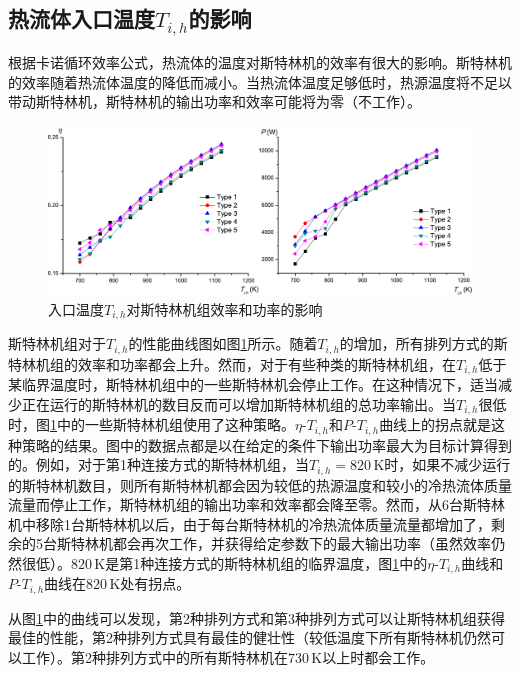 \subsection{热流体入口温度$T_{i,h}$的影响}
\label{sec:T_i_h}
根据卡诺循环效率公式，热流体的温度对斯特林机的效率有很大的影响。斯特林机的效率随着热流体温度的降低而减小。当热流体温度足够低时，热源温度将不足以带动斯特林机，斯特林机的输出功率和效率可能将为零（不工作）。
\begin{figure}[htpb]
\begin{center}
	\includegraphics[width = 0.95\columnwidth]{fig/T_ih}
	\caption{入口温度$T_{i,h}$对斯特林机组效率和功率的影响}
	\label{fig:Ti_h}
\end{center}
\end{figure}
斯特林机组对于$T_{i,h}$的性能曲线图如图\ref{fig:Ti_h}所示。随着$T_{i,h}$的增加，所有排列方式的斯特林机组的效率和功率都会上升。然而，对于有些种类的斯特林机组，在$T_{i,h}$低于某临界温度时，斯特林机组中的一些斯特林机会停止工作。在这种情况下，适当减少正在运行的斯特林机的数目反而可以增加斯特林机组的总功率输出。当$T_{i,h}$很低时，图\ref{fig:Ti_h}中的一些斯特林机组使用了这种策略。$\eta$-$T_{i,h}$和$P$-$T_{i,h}$曲线上的拐点就是这种策略的结果。图中的数据点都是以在给定的条件下输出功率最大为目标计算得到的。例如，对于第1种连接方式的斯特林机组，当$T_{i,h} = 820\,\mathrm{K}$时，如果不减少运行的斯特林机数目，则所有斯特林机都会因为较低的热源温度和较小的冷热流体质量流量而停止工作，斯特林机组的输出功率和效率都会降至零。然而，从6台斯特林机中移除1台斯特林机以后，由于每台斯特林机的冷热流体质量流量都增加了，剩余的5台斯特林机都会再次工作，并获得给定参数下的最大输出功率（虽然效率仍然很低）。$820\,\mathrm{K}$是第1种连接方式的斯特林机组的临界温度，图\ref{fig:Ti_h}中的$\eta$-$T_{i,h}$曲线和$P$-$T_{i,h}$曲线在$820\,\mathrm{K}$处有拐点。

从图\ref{fig:Ti_h}中的曲线可以发现，第2种排列方式和第3种排列方式可以让斯特林机组获得最佳的性能，第2种排列方式具有最佳的健壮性（较低温度下所有斯特林机仍然可以工作）。第2种排列方式中的所有斯特林机在$730\,\mathrm{K}$以上时都会工作。

